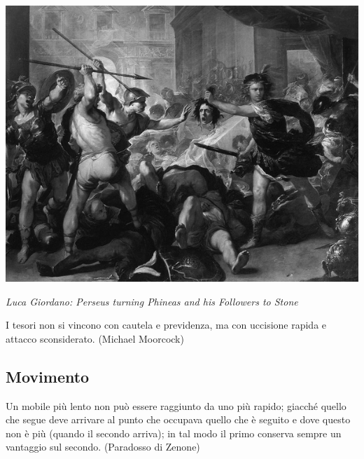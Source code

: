 \begin{center}

\includegraphics[width=0.8\linewidth]{immagini/Perseus_Fighting_Phineus_and_his_Companions.png}

	\emph{Luca Giordano: Perseus turning Phineas and his Followers to Stone}

\end{center}

\bigskip

\begin{enfasi}
I tesori non si vincono con cautela e previdenza, ma con uccisione rapida e attacco sconsiderato. (Michael Moorcock)
\end{enfasi}


\pagebreak

\subsection{Movimento}\label{movimento}

\begin{enfasi}{Un mobile più lento non può essere raggiunto da uno più rapido; giacché quello che segue deve arrivare al punto che occupava quello che è seguito e dove questo non è più (quando il secondo arriva); in tal modo il primo conserva sempre un vantaggio sul secondo. (Paradosso di Zenone)}
\end{enfasi}

